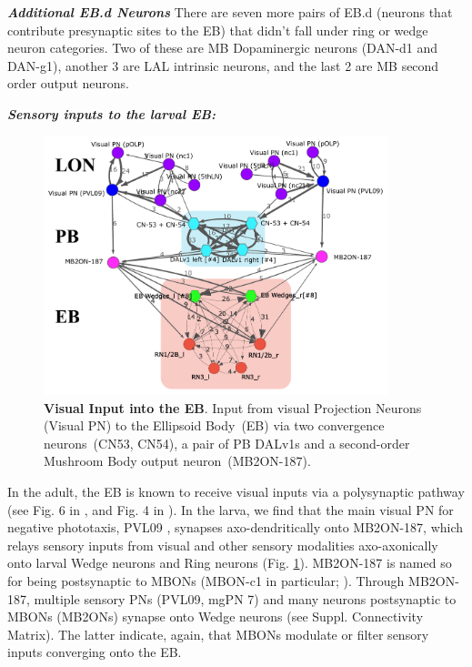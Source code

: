     \textbf{\textit{Additional EB.d Neurons}}
    There are seven more pairs of EB.d (neurons that contribute presynaptic sites to the EB) that didn't fall under ring or wedge neuron categories. Two of these are MB Dopaminergic neurons (DAN-d1 and DAN-g1), another 3 are LAL intrinsic neurons, and the last 2 are MB second order output neurons. %


    \textbf{\textit{Sensory inputs to the larval EB:}}

        \begin{figure}
            \centering
            \includegraphics[width=10cm]{Figs/CX/visualPNstoPBEB.pdf}
            \caption{\textbf{Visual Input into the EB}. Input from visual Projection Neurons (Visual PN) to the Ellipsoid Body~(EB) via two convergence neurons~(CN53, CN54), a pair of PB DALv1s and a second-order Mushroom Body output neuron~(MB2ON-187).}
            \label{visualPBEB}
        \end{figure}
        
    In the adult, the EB is known to receive visual inputs via a polysynaptic pathway (see Fig. 6 in \citep{hulse2021connectome}, and Fig. 4 in \citep{omoto2018neuronal}).
    In the larva, we find that the main visual PN for negative phototaxis, PVL09 \citep{Humberg2018PVL09}, synapses axo-dendritically onto MB2ON-187, which relays sensory inputs from visual and other sensory modalities axo-axonically onto larval Wedge neurons and Ring neurons (Fig. \ref{visualPBEB}).
    MB2ON-187 is named so for being postsynaptic to MBONs (MBON-c1 in particular; \citep{eschbach2021circuits}).
    Through MB2ON-187, multiple sensory PNs (PVL09, mgPN 7) and many neurons postsynaptic to MBONs (MB2ONs) synapse onto Wedge neurons (see Suppl. Connectivity Matrix).
    The latter indicate, again, that MBONs modulate or filter sensory inputs converging onto the EB.



